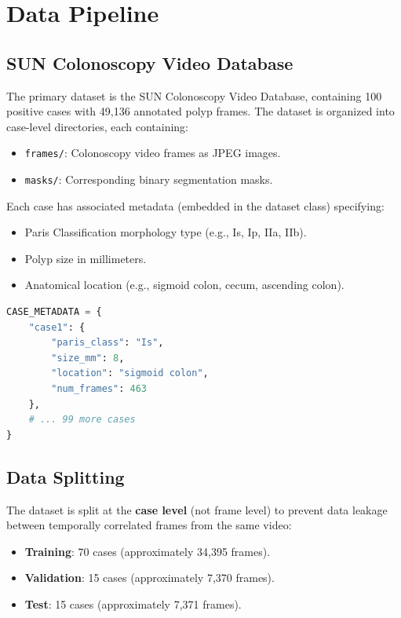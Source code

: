 \section{Data Pipeline}
\label{sec:impl:data}

\subsection{SUN Colonoscopy Video Database}
\label{sec:impl:sun}

The primary dataset is the \ac{SUN} Colonoscopy Video Database, containing 100 positive cases with 49{,}136 annotated polyp frames. The dataset is organized into case-level directories, each containing:

\begin{itemize}
	\item \texttt{frames/}: Colonoscopy video frames as JPEG images.
	\item \texttt{masks/}: Corresponding binary segmentation masks.
\end{itemize}

Each case has associated metadata (embedded in the dataset class) specifying:
\begin{itemize}
	\item Paris Classification morphology type (e.g., Is, Ip, IIa, IIb).
	\item Polyp size in millimeters.
	\item Anatomical location (e.g., sigmoid colon, cecum, ascending colon).
\end{itemize}

\begin{lstlisting}[language=Python, caption={Example of case-level metadata definition.}, label={lst:metadata}]
CASE_METADATA = {
    "case1": {
        "paris_class": "Is",
        "size_mm": 8,
        "location": "sigmoid colon",
        "num_frames": 463
    },
    # ... 99 more cases
}
\end{lstlisting}

\subsection{Data Splitting}
\label{sec:impl:split}

The dataset is split at the \textbf{case level} (not frame level) to prevent data leakage between temporally correlated frames from the same video:

\begin{itemize}
	\item \textbf{Training}: 70 cases (approximately 34{,}395 frames).
	\item \textbf{Validation}: 15 cases (approximately 7{,}370 frames).
	\item \textbf{Test}: 15 cases (approximately 7{,}371 frames).
\end{itemize}

